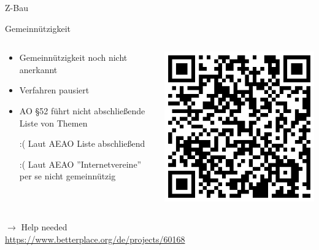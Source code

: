 \begin{frame}{Z-Bau}
{    }
\end{frame}

\begin{frame}{Gemeinnützigkeit}
    \begin{columns}[T]
        \begin{column}{0.6\textwidth}
            \begin{itemize}
                \item Gemeinnützigkeit noch nicht anerkannt
                \item Verfahren pausiert
                \item AO §52 führt nicht abschließende Liste von Themen
                \item[:(] Laut AEAO Liste abschließend
                \item[:(] Laut AEAO ''Internetvereine'' per se nicht gemeinnützig
            \end{itemize}
        \end{column}
        \begin{column}{0.35\textwidth}
            \includegraphics[width=\textwidth]{img/betterplace}
        \end{column}
    \end{columns}

    \vfill

    $\rightarrow$ Help needed\\
    \url{https://www.betterplace.org/de/projects/60168}

    \vfill
\end{frame}

